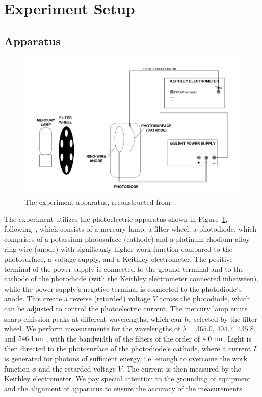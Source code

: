 \documentclass[aps,twocolumn,secnumarabic,balancelastpage,amsmath,amssymb,nofootinbib,floatfix]{revtex4-1}
\newcommand{\nm}{\,{\rm nm}}
\begin{document}
\section{Experiment Setup}
\label{sec:experiment}

\subsection{Apparatus}
\label{sec:apparatus}

\begin{figure}
    \centering
    \includegraphics[width=0.49 \textwidth]{Figures/apparatus.png}
    \caption{The experiment apparatus, reconstructed from~\citep{MITPhotoelectricEffect}.}
    \label{fig:apparatus}
\end{figure}

The experiment utilizes the photoelectric apparatus shown in Figure~\ref{fig:apparatus}, following~\citep{MITPhotoelectricEffect}, which consists of a mercury lamp, a filter wheel, a photodiode, which comprises of a potassium photosuface (cathode) and a platinum-rhodium alloy ring wire (anode) with significanly higher work function compared to the photosurface, a voltage supply, and a Keithley electrometer. The positive terminal of the power supply is connected to the ground terminal and to the cathode of the photodiode (with the Keithley electrometer connected inbetween), while the power supply's negative terminal is connected to the photodiode's anode. This create a reverse (retarded) voltage $V$ across the photodiode, which can be adjusted to control the photoelectric current. The mercury lamp emits sharp emission peaks at different wavelengths, which can be selected by the filter wheel. We perform measurements for the wavelengths of $\lambda = 365.0, \, 404.7, \, 435.8,$ and $546.1\nm$, with the bandwidth of the filters of the order of $4.0\nm$. Light is then directed to the photosurface of the photodiode's cathode, where a current $I$ is generated for photons of sufficient energy, i.e. enough to overcome the work function $\phi$ and the retarded voltage $V$. The current is then measured by the Keithley electrometer. We pay special attention to the grounding of equipment and the alignment of apparatus to ensure the accuracy of the measurements.
\end{document}
